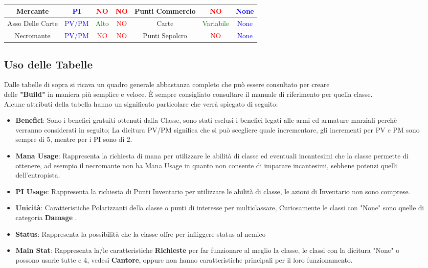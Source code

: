 \documentclass{article}
\begin{document}
\begin{table}[h]
\begin{tabular}{|c|c|c|c|c|c|c|}
      \hline
      \centering Mercante& \textcolor{blue}{PI}   & \textcolor{red}{NO} & \textcolor{red}{NO} & Punti Commercio & \textcolor{red}{NO} &\textcolor{blue}{None} \\
      \hline
      \centering Asso Delle Carte& \textcolor{blue}{PV/PM}   & \textcolor{green}{Alto} & \textcolor{red}{NO} & Carte & \textcolor{green}{Variabile} &\textcolor{blue}{None} \\
      \hline
      \centering Necromante& \textcolor{blue}{PV/PM}   & \textcolor{red}{NO} & \textcolor{red}{NO} & Punti Sepolcro & \textcolor{red}{NO} &\textcolor{blue}{None} \\
      \hline
    \end{tabular}
  \end{table}
\newpage
\subsection{Uso delle Tabelle}
Dalle tabelle di sopra si ricava un quadro generale abbastanza completo che può essere consultato per creare \\
delle \textbf{"Build"} in maniera più semplice e veloce. È sempre consigliato consultare il manuale di riferimento per quella classe.\\
Alcune attributi della tabella hanno un significato particolare che verrà spiegato di seguito:
\begin{itemize}
  \item \textbf{Benefici}: Sono i benefici gratuiti ottenuti dalla Classe, sono stati esclusi i benefici legati alle armi ed armature marziali perchè verranno considerati in seguito; La dicitura PV/PM significa che si può scegliere quale incrementare, gli incrementi per PV e PM sono sempre di 5, mentre per i PI sono di 2.
  \item \textbf{Mana Usage}: Rappresenta la richiesta di mana per utilizzare le abilità di classe ed eventuali incantesimi che la classe permette di ottenere, ad esempio il necromante non ha Mana Usage in quanto non consente di imparare incantesimi, sebbene potenzi quelli dell'entropista.
  \item \textbf{PI Usage}: Rappresenta la richiesta di Punti Inventario per utilizzare le abilità di classe, le azioni di Inventario non sono comprese.
  \item \textbf{Unicità}: Caratteristiche Polarizzanti della classe o punti di interesse per multiclassare, Curiosamente le classi con "None" sono quelle di categoria \textbf{Damage} .
  \item \textbf{Status}: Rappresenta la possibilità che la classe offre per infliggere status al nemico
  \item \textbf{Main Stat}: Rappresenta la/le caratteristiche \textbf{Richieste} per far funzionare al meglio la classe, le classi con la dicitura "None" o possono usarle tutte e 4, vedesi \textbf{Cantore}, oppure non hanno caratteristiche principali per il loro funzionamento.
\end{itemize}
\end{document}

